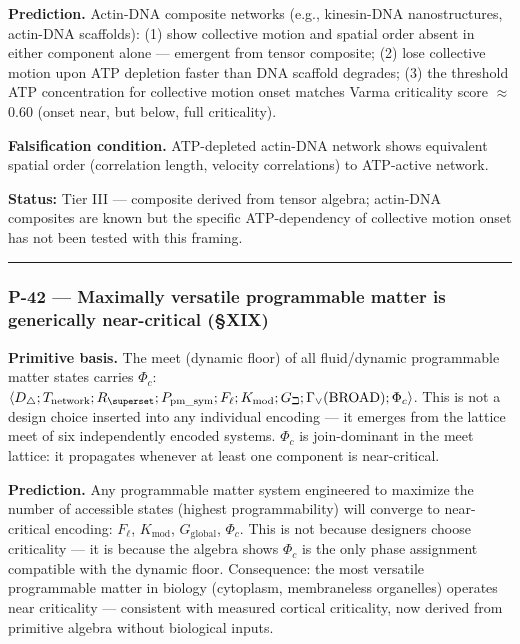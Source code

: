 \documentclass[12pt,a4paper]{article}
\begin{document}
\textbf{Prediction.} Actin-DNA composite networks (e.g., kinesin-DNA nanostructures, actin-DNA scaffolds): (1) show collective motion and spatial order absent in either component alone --- emergent from tensor composite; (2) lose collective motion upon ATP depletion faster than DNA scaffold degrades; (3) the threshold ATP concentration for collective motion onset matches Varma criticality score $\approx$ 0.60 (onset near, but below, full criticality).

\textbf{Falsification condition.} ATP-depleted actin-DNA network shows equivalent spatial order (correlation length, velocity correlations) to ATP-active network.

\textbf{Status:} Tier III --- composite derived from tensor algebra; actin-DNA composites are known but the specific ATP-dependency of collective motion onset has not been tested with this framing.

\begin{center}
\rule{0.5\textwidth}{0.4pt}
\end{center}

\subsubsection{P-42 --- Maximally versatile programmable matter is generically near-critical (§XIX)}

\textbf{Primitive basis.} The meet (dynamic floor) of all fluid/dynamic programmable matter states carries $\Phi_c$: $\langle D_\triangle; T_\text{network}; R_\superset; P_{\text{pm\_sym}}; F_\ell; K_\text{mod}; G_\beth; \Gamma_\vee(\text{BROAD}); \Phi_c \rangle$. This is not a design choice inserted into any individual encoding --- it emerges from the lattice meet of six independently encoded systems. $\Phi_c$ is join-dominant in the meet lattice: it propagates whenever at least one component is near-critical.

\textbf{Prediction.} Any programmable matter system engineered to maximize the number of accessible states (highest programmability) will converge to near-critical encoding: $F_\ell$, $K_\text{mod}$, $G_\text{global}$, $\Phi_c$. This is not because designers choose criticality --- it is because the algebra shows $\Phi_c$ is the only phase assignment compatible with the dynamic floor. Consequence: the most versatile programmable matter in biology (cytoplasm, membraneless organelles) operates near criticality --- consistent with measured cortical criticality, now derived from primitive algebra without biological inputs.
\end{document}
